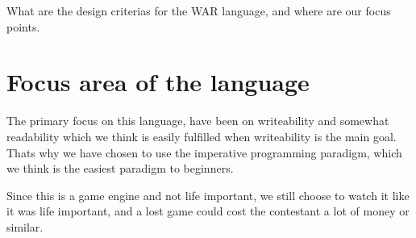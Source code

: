 What are the design criterias for the WAR language, and where are our focus points.

\section{Focus area of the language}

The primary focus on this language, have been on writeability and somewhat readability which we think is easily fulfilled when writeability is the main goal. Thats why we have chosen to use the imperative programming paradigm, which we think is the easiest paradigm to beginners.  

Since this is a game engine and not life important, we still choose to watch it like it was life important, and a lost game could cost the contestant a lot of money or similar.



